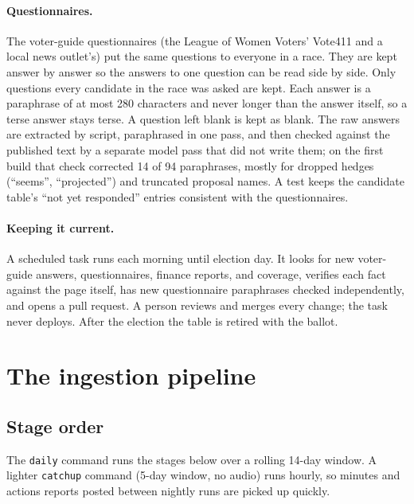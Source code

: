 \documentclass[11pt]{article}
\newcommand{\code}[1]{\texttt{#1}}
\begin{document}
\paragraph{Questionnaires.} The voter-guide questionnaires (the League of Women Voters'
Vote411 and a local news outlet's) put the same questions to everyone in a race. They
are kept answer by answer so the answers to one question can be read side by side.
Only questions every candidate in the race was asked are kept. Each answer is a
paraphrase of at most 280 characters and never longer than the answer itself, so a
terse answer stays terse. A question left blank is kept as blank. The raw answers are
extracted by script, paraphrased in one pass, and then checked against the published
text by a separate model pass that did not write them; on the first build that check
corrected 14 of 94 paraphrases, mostly for dropped hedges (``seems'', ``projected'')
and truncated proposal names. A test keeps the candidate table's ``not yet responded''
entries consistent with the questionnaires.

\paragraph{Keeping it current.} A scheduled task runs each morning until election day.
It looks for new voter-guide answers, questionnaires, finance reports, and coverage,
verifies each fact against the page itself, has new questionnaire paraphrases checked
independently, and opens a pull request. A person reviews and merges every change; the
task never deploys. After the election the table is retired with the ballot.

\section{The ingestion pipeline}

\subsection{Stage order}

The \code{daily} command runs the stages below over a rolling 14-day window. A lighter
\code{catchup} command (5-day window, no audio) runs hourly, so minutes and actions
reports posted between nightly runs are picked up quickly.
\end{document}
